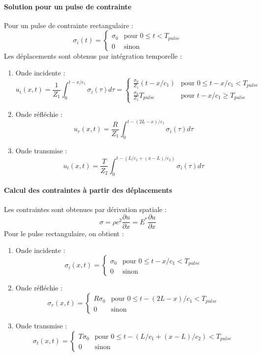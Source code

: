 \documentclass[10pt]{book}
\begin{document}
\paragraph{Solution pour un pulse de contrainte}
Pour un pulse de contrainte rectangulaire :
$$\sigma_i(t) = \begin{cases}
\sigma_0 & \text{pour } 0 \leq t < T_{pulse} \\
0 & \text{sinon}
\end{cases}$$
Les déplacements sont obtenus par intégration temporelle :
\begin{enumerate}
\item Onde incidente :
$$u_i(x,t) = \frac{1}{Z_1}\int_0^{t-x/c_1} \sigma_i(\tau) d\tau = \begin{cases}
\frac{\sigma_0}{Z_1}(t-x/c_1) & \text{pour } 0 \leq t-x/c_1 < T_{pulse} \\
\frac{\sigma_0}{Z_1}T_{pulse} & \text{pour } t-x/c_1 \geq T_{pulse}
\end{cases}$$
\item Onde réfléchie :
$$u_r(x,t) = \frac{R}{Z_1}\int_0^{t-(2L-x)/c_1} \sigma_i(\tau) d\tau$$
\item Onde transmise :
$$u_t(x,t) = \frac{T}{Z_2}\int_0^{t-(L/c_1+(x-L)/c_2)} \sigma_i(\tau) d\tau$$
\end{enumerate}
\paragraph{Calcul des contraintes à partir des déplacements}
Les contraintes sont obtenues par dérivation spatiale :
$$\sigma = \rho c^2 \frac{\partial u}{\partial x} = E^* \frac{\partial u}{\partial x}$$
Pour le pulse rectangulaire, on obtient :
\begin{enumerate}
\item Onde incidente :
$$\sigma_i(x,t) = \begin{cases}
\sigma_0 & \text{pour } 0 \leq t-x/c_1 < T_{pulse} \\
0 & \text{sinon}
\end{cases}$$
\item Onde réfléchie :
$$\sigma_r(x,t) = \begin{cases}
R\sigma_0 & \text{pour } 0 \leq t-(2L-x)/c_1 < T_{pulse} \\
0 & \text{sinon}
\end{cases}$$
\item Onde transmise :
$$\sigma_t(x,t) = \begin{cases}
T\sigma_0 & \text{pour } 0 \leq t-(L/c_1+(x-L)/c_2) < T_{pulse} \\
0 & \text{sinon}
\end{cases}$$
\end{enumerate}
\end{document}
